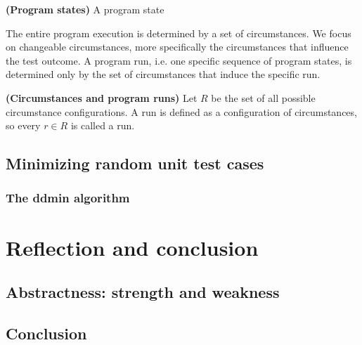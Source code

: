 \documentclass[a4paper,UKenglish]{lipics-v2018}
\newcommand{\defsub}[1]{\textbf{(#1)} }
\begin{document}
 \defsub{Program states} A program state 

The entire program execution is determined by a set of circumstances. We focus on changeable circumstances, more specifically the circumstances that influence the test outcome. A program run, i.e. one specific sequence of program states, is determined only by the set of circumstances that induce the specific run.

 \defsub{Circumstances and program runs} Let $R$ be the set of all possible circumstance configurations. A run is defined as a configuration of circumstances, so every $r \in R$ is called a run.

\subsection{Minimizing random unit test cases}
\subsubsection{The ddmin algorithm}

\section{Reflection and conclusion}
\subsection{Abstractness: strength and weakness}
\subsection{Conclusion}
\end{document}
